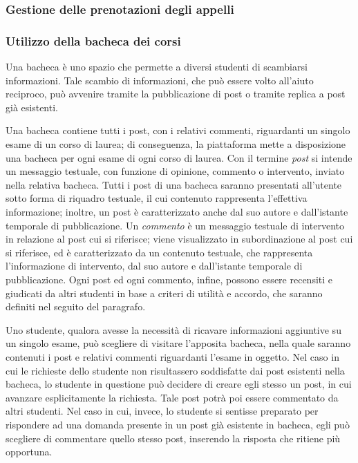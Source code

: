 \documentclass [a4paper,11pt]{book}
\begin{document}
\medskip

\subsubsection{Gestione delle prenotazioni degli appelli}

\medskip

\subsubsection{Utilizzo della bacheca dei corsi}

Una bacheca è uno spazio che permette a diversi studenti di scambiarsi informazioni. Tale scambio di informazioni, che può essere volto all'aiuto reciproco, può avvenire tramite la pubblicazione di post o tramite replica a post già esistenti.

Una bacheca contiene tutti i post, con i relativi commenti, riguardanti un singolo esame di un corso di laurea; di conseguenza, la piattaforma mette a disposizione una bacheca per ogni esame di ogni corso di laurea. Con il termine \emph{post} si intende un messaggio testuale, con funzione di opinione, commento o intervento, inviato nella relativa bacheca. Tutti i post di una bacheca saranno presentati all'utente sotto forma di riquadro testuale, il cui contenuto rappresenta l'effettiva informazione; inoltre, un post è caratterizzato anche dal suo autore e dall'istante temporale di pubblicazione. Un \emph{commento} è un messaggio testuale di intervento in relazione al post cui si riferisce; viene visualizzato in subordinazione al post cui si riferisce, ed è caratterizzato da un contenuto testuale, che rappresenta l'informazione di intervento, dal suo autore e dall'istante temporale di pubblicazione. Ogni post ed ogni commento, infine, possono essere recensiti e giudicati da altri studenti in base a criteri di utilità e accordo, che saranno definiti nel seguito del paragrafo.

Uno studente, qualora avesse la necessità di ricavare informazioni aggiuntive su un singolo esame, può scegliere di visitare l'apposita bacheca, nella quale saranno contenuti i post e relativi commenti riguardanti l'esame in oggetto. Nel caso in cui le richieste dello studente non risultassero soddisfatte dai post esistenti nella bacheca, lo studente in questione può decidere di creare egli stesso un post, in cui avanzare esplicitamente la richiesta. Tale post potrà poi essere commentato da altri studenti. Nel caso in cui, invece, lo studente si sentisse preparato per rispondere ad una domanda presente in un post già esistente in bacheca, egli può scegliere di commentare quello stesso post, inserendo la risposta che ritiene più opportuna.
\end{document}
